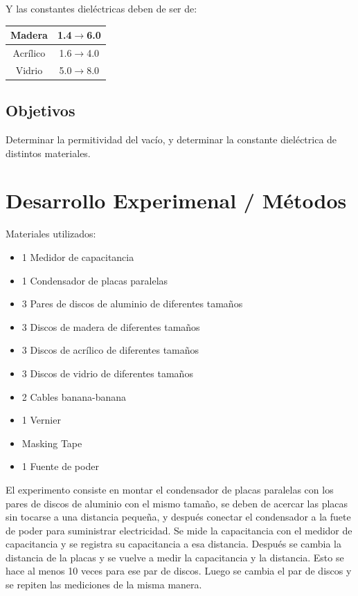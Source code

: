 \documentclass[article,12pt]{elsarticle}
\begin{document}
    Y las constantes dieléctricas deben de ser de:
    \begin{table}[H]
    \begin{center}
\begin{tabular}{|c|c|}
\hline
Madera   & 1.4$\rightarrow$6.0  \\ \hline
Acrílico & 1.6$\rightarrow$4.0  \\ \hline
Vidrio   & 5.0$\rightarrow$8.0 \\ \hline
\end{tabular}
\end{center}
\end{table}
    \subsection{Objetivos}
    Determinar la permitividad del vacío, y determinar la constante dieléctrica de distintos materiales.

\section{Desarrollo Experimenal / Métodos}
Materiales utilizados:
    \begin{itemize}
        \item 1 Medidor de capacitancia
        \item 1 Condensador de placas paralelas
        \item 3 Pares de discos de aluminio de diferentes tamaños
        \item 3 Discos de madera de diferentes tamaños
        \item 3 Discos de acrílico de diferentes tamaños
        \item 3 Discos de vidrio de diferentes tamaños
        \item 2 Cables banana-banana
        \item 1 Vernier
        \item Masking Tape
        \item 1 Fuente de poder
    \end{itemize}
    El experimento consiste en montar el condensador de placas paralelas con los pares de discos de aluminio con el mismo tamaño, se deben de acercar las placas sin tocarse a una distancia pequeña, y después conectar el condensador a la fuete de poder para suministrar electricidad. Se mide la capacitancia con el medidor de capacitancia y se registra su capacitancia a esa distancia. Después se cambia la distancia de la placas y se vuelve a medir la capacitancia y la distancia. Esto se hace al menos 10 veces para ese par de discos. Luego se cambia el par de discos y se repiten las mediciones de la misma manera.
    
\end{document}
